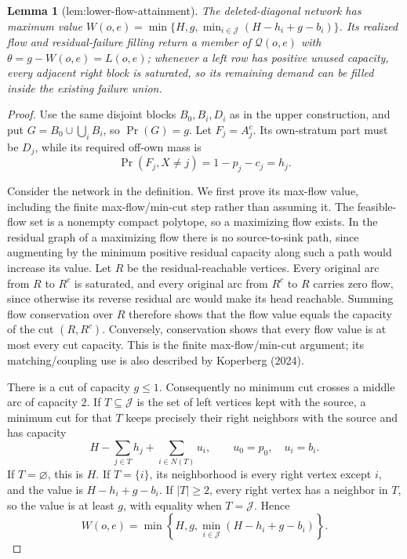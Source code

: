 \documentclass{article}
\newtheorem{lemma}{Lemma}
\begin{document}
\begin{lemma}[lem:lower-flow-attainment]\label{lem:lower-flow-attainment}
The deleted-diagonal network has maximum value \(W(o,e)=\min\{H,g,\min_{i\in\mathcal J}(H-h_i+g-b_i)\}\). Its realized flow and residual-failure filling return a member of \(\mathcal Q(o,e)\) with \(\theta=g-W(o,e)=L(o,e)\); whenever a left row has positive unused capacity, every adjacent right block is saturated, so its remaining demand can be filled inside the existing failure union.
\end{lemma}
\begin{proof}
Use the same disjoint blocks \(B_0,B_i,D_i\) as in the upper construction, and put \(G=B_0\cup\bigcup_iB_i\), so \(\Pr(G)=g\).  Let \(F_j=A_j^c\).  Its own-stratum part must be \(D_j\), while its required off-own mass is
\[
 \Pr(F_j,X\ne j)=1-p_j-c_j=h_j.
\]

Consider the network in the definition.  We first prove its max-flow value, including the finite max-flow/min-cut step rather than assuming it.  The feasible-flow set is a nonempty compact polytope, so a maximizing flow exists.  In the residual graph of a maximizing flow there is no source-to-sink path, since augmenting by the minimum positive residual capacity along such a path would increase its value.  Let \(R\) be the residual-reachable vertices.  Every original arc from \(R\) to \(R^c\) is saturated, and every original arc from \(R^c\) to \(R\) carries zero flow, since otherwise its reverse residual arc would make its head reachable.  Summing flow conservation over \(R\) therefore shows that the flow value equals the capacity of the cut \((R,R^c)\).  Conversely, conservation shows that every flow value is at most every cut capacity.  This is the finite max-flow/min-cut argument; its matching/coupling use is also described by Koperberg (2024).

There is a cut of capacity \(g\leq1\).  Consequently no minimum cut crosses a middle arc of capacity \(2\).  If \(T\subseteq\mathcal J\) is the set of left vertices kept with the source, a minimum cut for that \(T\) keeps precisely their right neighbors with the source and has capacity
\[
 H-\sum_{j\in T}h_j+\sum_{i\in N(T)}u_i,
 \qquad u_0=p_0,\quad u_i=b_i.
\]
If \(T=\varnothing\), this is \(H\).  If \(T=\{i\}\), its neighborhood is every right vertex except \(i\), and the value is \(H-h_i+g-b_i\).  If \(|T|\geq2\), every right vertex has a neighbor in \(T\), so the value is at least \(g\), with equality when \(T=\mathcal J\).  Hence
\[
 W(o,e)=\min\left\{H,g,\min_{i\in\mathcal J}(H-h_i+g-b_i)\right\}.
\]


\end{proof}
\end{document}
